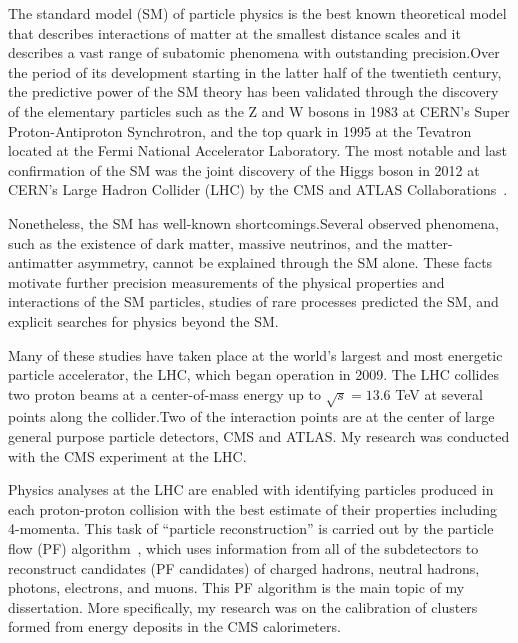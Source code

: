 
The standard model (SM) of particle physics %
is the best known theoretical model that describes interactions of matter at the smallest %
distance scales and it describes a vast range of subatomic phenomena with outstanding precision.Over the period of its development starting in the latter half of the twentieth century, the predictive power of the SM theory has been validated through the discovery of the elementary particles such as the Z and W bosons in 1983 at CERN's Super Proton-Antiproton Synchrotron, and the top quark in 1995 at the Tevatron located at the Fermi National Accelerator Laboratory. The most notable and last confirmation of the SM was the joint discovery of the Higgs boson in 2012 at CERN's Large Hadron Collider (LHC) by the CMS and ATLAS Collaborations~\cite{ATLAS:2012yve,CMS:2012qbp,CMS:2013btf}.

Nonetheless, the SM has well-known shortcomings.Several observed phenomena, such as the existence of dark matter, massive neutrinos, and the matter-antimatter asymmetry, cannot be explained through the SM alone.
These facts motivate further precision measurements of the physical properties and interactions of the SM particles, studies of rare processes predicted the SM, and explicit searches for physics beyond the SM.

Many of these studies have taken place at the world's largest and most energetic particle accelerator, the LHC, which began operation in 2009. The LHC collides two proton beams at a center-of-mass energy up to $\sqrt{s}=13.6$ TeV at several points along the collider.Two of the interaction points are at the center of large general purpose particle detectors, CMS and ATLAS. My research was conducted with the CMS experiment at the LHC.

Physics analyses at the LHC are enabled with identifying particles produced in each proton-proton collision with the best estimate of their properties including 4-momenta.
This task of ``particle reconstruction'' is carried out by the particle flow (PF) algorithm~\cite{PF}, which uses information from all of the subdetectors
to reconstruct candidates (PF candidates) of charged hadrons, neutral hadrons, photons, electrons, and muons.
This PF algorithm is the main topic of my dissertation.
More specifically, my research was on the calibration of clusters formed from energy deposits in the CMS calorimeters.


